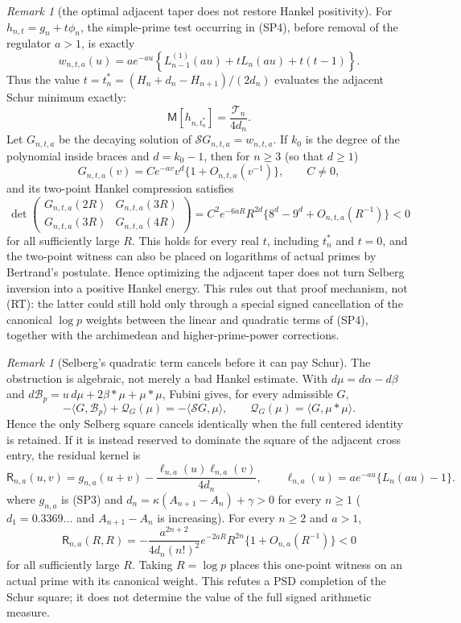 \documentclass[11pt]{amsart}
\theoremstyle{definition}
\theoremstyle{remark}
\newtheorem{remark}[theorem]{Remark}
\theoremstyle{definition}
\begin{document}
\begin{remark}[the optimal adjacent taper does not restore Hankel positivity]
\label{rmk:a1-tapered-selberg-gate}
For $h_{n,t}=g_n+t\phi_n$, the simple-prime test occurring in
(SP4), before removal of the regulator $a>1$, is exactly
\[
 w_{n,t,a}(u)=ae^{-au}
 \left\{L_{n-1}^{(1)}(au)+tL_n(au)+t(t-1)\right\}.
\]
Thus the value
$t=t_n^*=(H_n+d_n-H_{n+1})/(2d_n)$ evaluates the adjacent Schur
minimum exactly:
\[
 \mathsf M[h_{n,t_n^*}]=\frac{\mathcal T_n}{4d_n}.
\]
Let $G_{n,t,a}$ be the decaying solution of
$\mathcal SG_{n,t,a}=w_{n,t,a}$.  If $k_0$ is the degree of the polynomial
inside braces and $d=k_0-1$, then for $n\ge3$ (so that $d\ge1$)
\[
 G_{n,t,a}(v)=Ce^{-av}v^d\{1+O_{n,t,a}(v^{-1})\},\qquad C\ne0,
\]
and its two-point Hankel compression satisfies
\[
 \det\!\begin{pmatrix}
 G_{n,t,a}(2R)&G_{n,t,a}(3R)\\
 G_{n,t,a}(3R)&G_{n,t,a}(4R)
 \end{pmatrix}
 =C^2e^{-6aR}R^{2d}
   \{8^d-9^d+O_{n,t,a}(R^{-1})\}<0
\]
for all sufficiently large $R$.  This holds for every real $t$, including
$t_n^*$ and $t=0$, and the two-point witness can also be placed on
logarithms of actual primes by Bertrand's postulate.  Hence optimizing the
adjacent taper does not turn Selberg inversion into a positive Hankel
energy.  This rules out that proof mechanism, not (RT): the latter could
still hold only through a special signed cancellation of the canonical
$\log p$ weights between the linear and quadratic terms of (SP4), together
with the archimedean and higher-prime-power corrections.
\end{remark}

\begin{remark}[Selberg's quadratic term cancels before it can pay Schur]
\label{rmk:a1-selberg-square-cancellation}
The obstruction is algebraic, not merely a bad Hankel estimate.  With
$d\mu=d\alpha-d\beta$ and
$d\mathcal B_p=u\,d\mu+2\beta*\mu+\mu*\mu$, Fubini gives, for every
admissible $G$,
\[
 -\langle G,\mathcal B_p\rangle+\mathcal Q_G(\mu)
 =-\langle\mathcal SG,\mu\rangle,
 \qquad
 \mathcal Q_G(\mu)=\langle G,\mu*\mu\rangle.
\]
Hence the only Selberg square cancels identically when the full centered
identity is retained.  If it is instead reserved to dominate the square
of the adjacent cross entry, the residual kernel is
\[
 \mathsf R_{n,a}(u,v)=g_{n,a}(u+v)
 -\frac{\ell_{n,a}(u)\ell_{n,a}(v)}{4d_n},
 \qquad
 \ell_{n,a}(u)=ae^{-au}\{L_n(au)-1\}.
\]
where $g_{n,a}$ is (SP3) and $d_n=\kappa(A_{n+1}-A_n)+\gamma>0$ for every $n\ge1$
($d_1=0.3369\ldots$ and $A_{n+1}-A_n$ is increasing).  For every $n\ge2$ and $a>1$,
\[
 \mathsf R_{n,a}(R,R)=
 -\frac{a^{2n+2}}{4d_n(n!)^2}
 e^{-2aR}R^{2n}\{1+O_{n,a}(R^{-1})\}<0
\]
for all sufficiently large $R$.  Taking $R=\log p$ places this one-point
witness on an actual prime with its canonical weight.  This refutes a PSD
completion of the Schur square; it does not determine the value of the
full signed arithmetic measure.
\end{remark}
\end{document}
